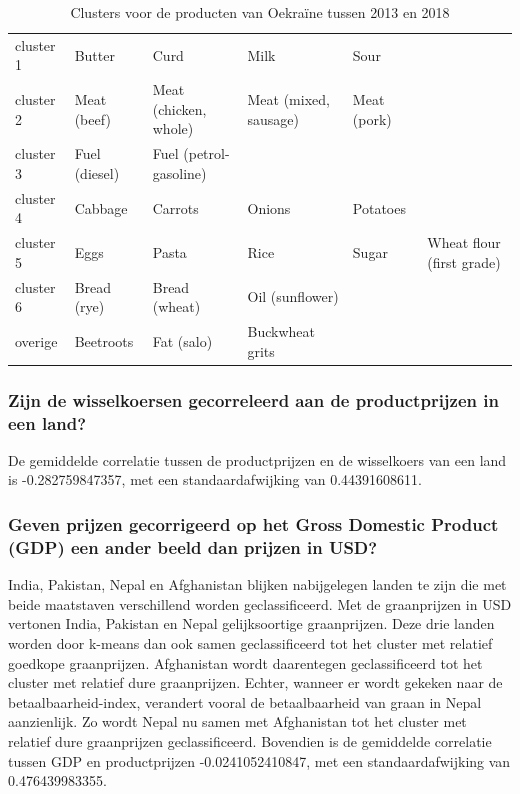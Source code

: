 \documentclass{article}
\begin{document}
\begin{table}[h!]
\centering
\caption{Clusters voor de producten van Oekraïne tussen 2013 en 2018 }
\label{clusters-2013-2018}
\begin{tabular}{l|lllll}
cluster 1 & Butter & Curd & Milk & Sour & \\
cluster 2 & Meat (beef) & Meat (chicken, whole) & Meat (mixed, sausage) & Meat (pork) & \\
cluster 3 & Fuel (diesel) & Fuel (petrol-gasoline) & & & \\
cluster 4 & Cabbage       & Carrots                & Onions                & Potatoes    &                           \\
cluster 5 & Eggs & Pasta & Rice & Sugar       & Wheat flour (first grade) \\
cluster 6 & Bread (rye)   & Bread (wheat)          & Oil (sunflower)       &             &                           \\ \hline
overige   & Beetroots     & Fat (salo)             & Buckwheat grits       &             &                          
\end{tabular}
\end{table}

\subsubsection*{Zijn de wisselkoersen gecorreleerd aan de productprijzen in een land?}
De gemiddelde correlatie tussen de productprijzen en de wisselkoers van een land is -0.282759847357, met een standaardafwijking van 0.44391608611.


\subsubsection*{Geven prijzen gecorrigeerd op het Gross Domestic Product (GDP) een ander beeld dan prijzen in USD?}
India, Pakistan, Nepal en Afghanistan blijken nabijgelegen landen te zijn die met beide maatstaven verschillend worden geclassificeerd. 
Met de graanprijzen in USD vertonen India, Pakistan en Nepal gelijksoortige graanprijzen. Deze drie landen worden door k-means dan ook samen geclassificeerd tot het cluster met relatief goedkope graanprijzen. Afghanistan wordt daarentegen geclassificeerd tot het cluster met relatief dure graanprijzen. Echter, wanneer er wordt gekeken naar de betaalbaarheid-index, verandert vooral de betaalbaarheid van graan in Nepal aanzienlijk. Zo wordt Nepal nu samen met Afghanistan tot het cluster met relatief dure graanprijzen geclassificeerd. Bovendien is de gemiddelde correlatie tussen GDP en productprijzen -0.0241052410847, met een standaardafwijking van 0.476439983355.
 
\end{document}
